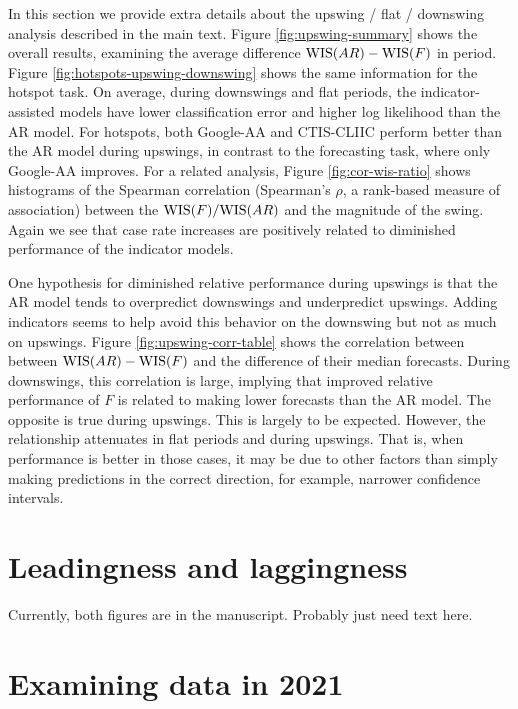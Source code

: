 In this section we provide extra details about the upswing / flat / downswing 
analysis described in the main text. Figure \ref{fig:upswing-summary} shows
the overall results, examining the average difference $\mathrm{WIS}(AR) - \mathrm{WIS}(F)$ in 
period. Figure \ref{fig:hotspots-upswing-downswing} shows the same information
for the hotspot task. On average, during downswings and flat periods, the 
indicator-assisted models have lower classification error and higher 
log likelihood than the AR model. For hotspots, both Google-AA and CTIS-CLIIC
perform better than the AR model during upswings, in contrast to the forecasting
task, where only Google-AA improves. For a related analysis, Figure 
\ref{fig:cor-wis-ratio} shows histograms of the Spearman
correlation (Spearman's $\rho$, a rank-based measure of association) between
the $\mathrm{WIS}(F)/\mathrm{WIS}(AR)$ and the magnitude of the swing. Again we see that case
rate increases are positively related to diminished performance of the 
indicator models.

One hypothesis for diminished relative performance during upswings is that 
the AR model tends to overpredict downswings and underpredict upswings. Adding
indicators seems to help avoid this behavior on the downswing but not as much 
on upswings. Figure \ref{fig:upswing-corr-table} shows the correlation between
between $\mathrm{WIS}(AR) - \mathrm{WIS}(F)$ and the difference of their median forecasts.
During 
downswings, this correlation is large, implying that improved relative
performance 
of $F$ is related to making lower forecasts than the AR model. The opposite is
true during upswings. This is largely to be expected. However, the relationship
attenuates in flat periods and during upswings. That is, when performance is
better 
in those cases, it may be due to other factors than simply making predictions
in the correct direction, for example, narrower confidence intervals.


\section{Leadingness and laggingness}

Currently, both figures are in the manuscript. Probably just need text here.

\section{Examining data in 2021}

